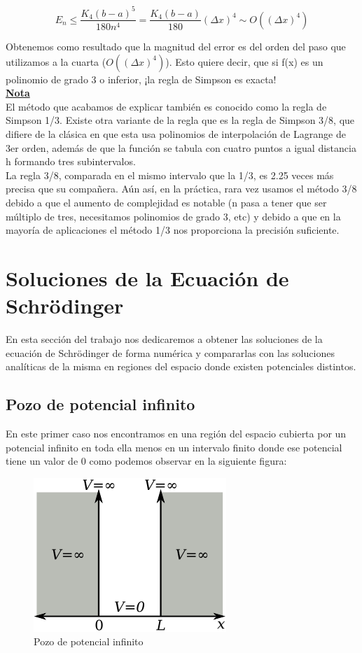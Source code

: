 \documentclass[12pt]{article}
\begin{document}
\begin{equation}
E_n \leq \frac{K_4(b-a)^5}{180n^4} = \frac{K_4(b-a)}{180}(\Delta x)^4 \sim O((\Delta x)^4)
\end{equation}

Obtenemos como resultado que la magnitud del error es del orden del paso que utilizamos a la cuarta ($O((\Delta x)^4)$). Esto quiere decir, que si f(x) es un polinomio de grado 3 o inferior, ¡la regla de Simpson es exacta!\\

\underline{\textbf{Nota}} \\

El método que acabamos de explicar también es conocido como la regla de Simpson 1/3. Existe otra variante de la regla que es la regla de Simpson 3/8, que difiere de la clásica en que esta usa polinomios de interpolación de Lagrange de 3er orden, además de que la función se tabula con cuatro puntos a igual distancia h formando tres subintervalos. \\

La regla 3/8, comparada en el mismo intervalo que la 1/3, es 2.25 veces más precisa que su compañera. Aún así, en la práctica, rara vez usamos el método 3/8 debido a que el aumento de complejidad es notable (n pasa a tener que ser múltiplo de tres, necesitamos polinomios de grado 3, etc) y debido a que en la mayoría de aplicaciones el método 1/3 nos proporciona la precisión suficiente.\\ 


\section{Soluciones de la Ecuación de Schrödinger}
En esta sección del trabajo nos dedicaremos a obtener las soluciones de la ecuación de Schrödinger de forma numérica y compararlas con las soluciones analíticas de la misma en regiones del espacio donde existen potenciales distintos.

\subsection{Pozo de potencial infinito}

En este primer caso nos encontramos en una región del espacio cubierta por un potencial infinito en toda ella menos en un intervalo finito donde ese potencial tiene un valor de 0 como podemos observar en la siguiente figura:

\begin{figure}[H]
    \centering
    \includegraphics[width=0.5\linewidth]{fotos/particula-caja-wiki.png}
    \caption{Pozo de potencial infinito}
\end{figure}
\end{document}

